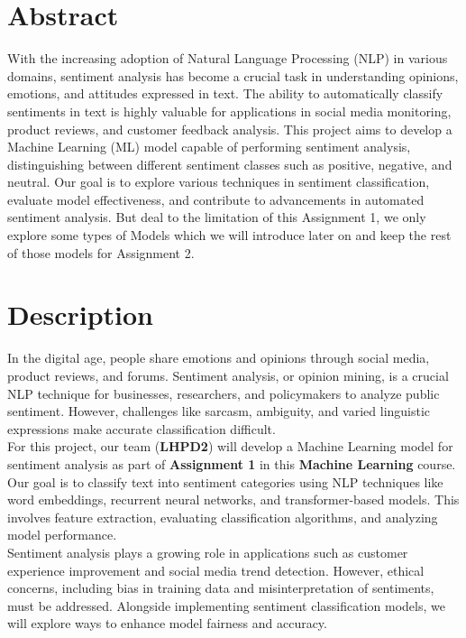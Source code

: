 \chapter{Abstract}

With the increasing adoption of Natural Language Processing (NLP) in various domains, sentiment analysis has become a crucial task in understanding opinions, emotions, and attitudes expressed in text. The ability to automatically classify sentiments in text is highly valuable for applications in social media monitoring, product reviews, and customer feedback analysis. This project aims to develop a Machine Learning (ML) model capable of performing sentiment analysis, distinguishing between different sentiment classes such as positive, negative, and neutral. Our goal is to explore various techniques in sentiment classification, evaluate model effectiveness, and contribute to advancements in automated sentiment analysis. But deal to the limitation of this Assignment 1, we only explore some types of Models which we will introduce later on and keep the rest of those models for Assignment 2.

\chapter{Description}

In the digital age, people share emotions and opinions through social media, product reviews, and forums. Sentiment analysis, or opinion mining, is a crucial NLP technique for businesses, researchers, and policymakers to analyze public sentiment. However, challenges like sarcasm, ambiguity, and varied linguistic expressions make accurate classification difficult.\\

For this project, our team (\textbf{LHPD2}) will develop a Machine Learning model for sentiment analysis as part of \textbf{Assignment 1} in this \textbf{Machine Learning} course. Our goal is to classify text into sentiment categories using NLP techniques like word embeddings, recurrent neural networks, and transformer-based models. This involves feature extraction, evaluating classification algorithms, and analyzing model performance.\\

Sentiment analysis plays a growing role in applications such as customer experience improvement and social media trend detection. However, ethical concerns, including bias in training data and misinterpretation of sentiments, must be addressed. Alongside implementing sentiment classification models, we will explore ways to enhance model fairness and accuracy.\\

